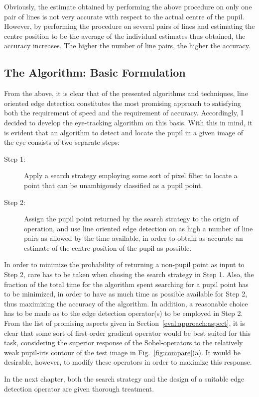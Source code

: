 Obviously, the estimate obtained by performing the above procedure on
only one pair of lines is not very accurate with respect to the actual
centre of the pupil.  However, by performing the procedure on several
pairs of lines and estimating the centre position to be the average of
the individual estimates thus obtained, the accuracy increases.  The
higher the number of line pairs, the higher the accuracy.

\subsection{The Algorithm: Basic Formulation}
\label{eval:approach:algo}

From the above, it is clear that of the presented algorithms and
techniques, line oriented edge detection constitutes the most
promising approach to satisfying both the requirement of speed and the
requirement of accuracy.  Accordingly, I decided to develop the
eye-tracking algorithm on this basis.  With this in mind, it is
evident that an algorithm to detect and locate the pupil in a given
image of the eye consists of two separate steps:

\begin{description}
\item[Step 1:] Apply a search strategy employing some sort of pixel
  filter to locate a point that can be unambigously classified as a
  pupil point.
\item[Step 2:] Assign the pupil point returned by the search strategy
  to the origin of operation, and use line oriented edge detection on
  as high a number of line pairs as allowed by the time available, in
  order to obtain as accurate an estimate of the centre position of
  the pupil as possible.
\end{description}

In order to minimize the probability of returning a non-pupil point as
input to Step 2, care has to be taken when chosing the search strategy
in Step 1.  Also, the fraction of the total time for the algorithm
spent searching for a pupil point has to be minimized, in order to
have as much time as possible available for Step 2, thus maximizing
the accuracy of the algorithm.  In addition, a reasonable choice has
to be made as to the edge detection operator(s) to be employed in Step
2.  From the list of promising aspects given in
Section~\ref{eval:approach:aspect}, it is clear that some sort of
first-order gradient operator would be best suited for this task,
considering the superior response of the Sobel-operators to the
relatively weak pupil-iris contour of the test image in
Fig.~\ref{fig:compare}(a).  It would be desirable, however, to modify
these operators in order to maximize this response.

In the next chapter, both the search strategy and the design of a
suitable edge detection operator are given thorough treatment.

